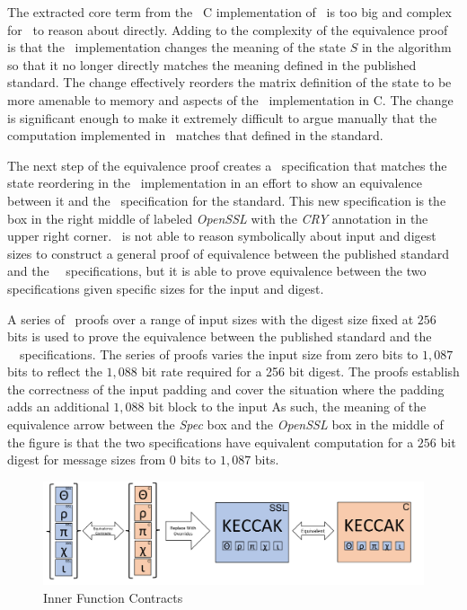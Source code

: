 The extracted core term from the \openssl\ C implementation of \shaThree\ is too big and complex for \saw\ to reason about directly.
Adding to the complexity of the equivalence proof is that the \openssl\ implementation changes the meaning of the state $S$ in the algorithm so that it no longer directly matches the meaning defined in the published standard.
The change effectively reorders the matrix definition of the state to be more amenable to memory and aspects of the \keccak\ implementation in C.
The change is significant enough to make it extremely difficult to argue manually that the computation implemented in \openssl\ matches that defined in the standard.

The next step of the equivalence proof creates a \cryptol\ specification that matches the state reordering in the \openssl\ implementation in an effort to show an equivalence between it and the \cryptol\ specification for the standard.
This new specification is the box in the right middle of  labeled \emph{OpenSSL} with the \emph{CRY} annotation in the upper right corner.
\saw\ is not able to reason symbolically about input and digest sizes to construct a general proof of equivalence between the published standard and the \openssl\ \cryptol\ specifications, but it is able to prove equivalence between the two specifications given specific sizes for the input and digest.

A series of \saw\ proofs over a range of input sizes with the digest size fixed at $256$ bits is used to prove the equivalence between the published standard and the \openssl\ \cryptol\ specifications.
The series of proofs varies the input size from zero bits to $1,087$ bits to reflect the $1,088$ bit rate required for a 256 bit digest.
The proofs establish the correctness of the input padding and cover the situation where the padding adds an additional $1,088$ bit block to the input 
As such, the meaning of the equivalence arrow between the \emph{Spec} box and the \emph{OpenSSL} box in the middle of the figure is that the two specifications have equivalent computation for a $256$ bit digest for message sizes from $0$ bits to $1,087$ bits.

\begin{figure}[t]
  \centering
  \includegraphics[width=\linewidth]{figs/proof2.png}
  
  \caption{Inner Function Contracts}
  \label{fig:proofStructure2}
  
\end{figure}

